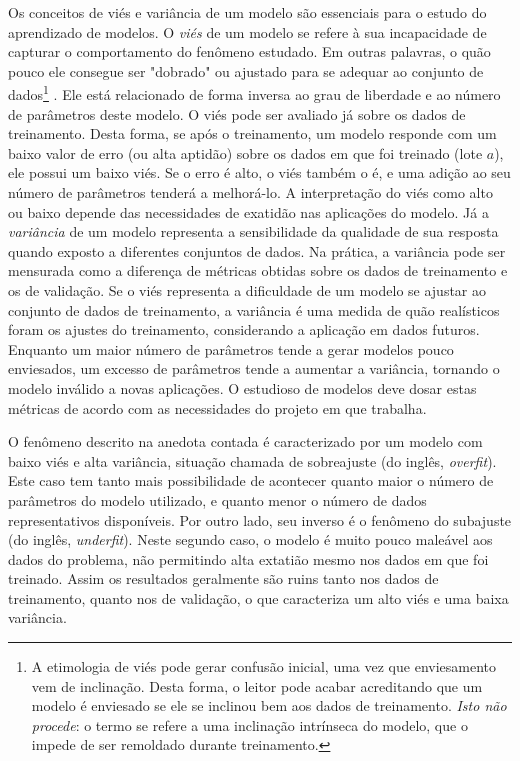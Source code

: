       Os conceitos de viés e variância de um modelo são essenciais para o estudo do aprendizado de modelos. O \emph{viés} de um modelo se refere à sua incapacidade de capturar o comportamento do fenômeno estudado. Em outras palavras, o quão pouco ele consegue ser "dobrado" ou ajustado para se adequar ao conjunto de dados\footnote{A etimologia de viés pode gerar confusão inicial, uma vez que enviesamento vem de inclinação. Desta forma, o leitor pode acabar acreditando que um modelo é enviesado se ele se inclinou bem aos dados de treinamento. \emph{Isto não procede}: o termo se refere a uma inclinação intrínseca do modelo, que o impede de ser remoldado durante treinamento.}
      .
      Ele está relacionado de forma inversa ao grau de liberdade e ao número de parâmetros deste modelo. O viés pode ser avaliado já sobre os dados de treinamento. Desta forma, se após o treinamento, um modelo responde com um baixo valor de erro (ou alta aptidão) sobre os dados em que foi treinado (lote $a$), ele possui um baixo viés. Se o erro é alto, o viés também o é, e uma adição ao seu número de parâmetros tenderá a melhorá-lo. A interpretação do viés como alto ou baixo depende das necessidades de exatidão nas aplicações do modelo. Já a \emph{variância} de um modelo representa a sensibilidade da qualidade de sua resposta quando exposto a diferentes conjuntos de dados. Na prática, a variância pode ser mensurada como a diferença de métricas obtidas sobre os dados de treinamento e os de validação. Se o viés representa a dificuldade de um modelo se ajustar ao conjunto de dados de treinamento, a variância é uma medida de quão realísticos foram os ajustes do treinamento, considerando a aplicação em dados futuros. Enquanto um maior número de parâmetros tende a gerar modelos pouco enviesados, um excesso de parâmetros tende a aumentar a variância, tornando o modelo inválido a novas aplicações. O estudioso de modelos deve dosar estas métricas de acordo com as necessidades do projeto em que trabalha.

      O fenômeno descrito na anedota contada é caracterizado por um modelo com baixo viés e alta variância, situação chamada de sobreajuste (do inglês, \textit{overfit}). Este caso tem tanto mais possibilidade de acontecer quanto maior o número de parâmetros do modelo utilizado, e quanto menor o número de dados representativos disponíveis. Por outro lado, seu inverso é o fenômeno do subajuste (do inglês, \textit{underfit}). Neste segundo caso, o modelo é muito pouco maleável aos dados do problema, não permitindo alta extatião mesmo nos dados em que foi treinado. Assim os resultados geralmente são ruins tanto nos dados de treinamento, quanto nos de validação, o que caracteriza um alto viés e uma baixa variância.

